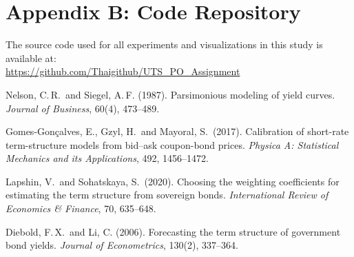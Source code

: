 \documentclass[12pt]{article}
\begin{document}
\section*{Appendix B: Code Repository}
The source code used for all experiments and visualizations in this study is available at:\\
\url{https://github.com/Thaigithub/UTS_PO_Assignment}



\begin{thebibliography}{}

Nelson, C.\,R.\ and Siegel, A.\,F. (1987).
Parsimonious modeling of yield curves.
\textit{Journal of Business}, 60(4), 473--489.

Gomes-Gon\c{c}alves, E., Gzyl, H.\ and Mayoral, S.\ (2017).
Calibration of short-rate term-structure models from bid–ask coupon-bond prices.
\textit{Physica A: Statistical Mechanics and its Applications}, 492, 1456--1472.

Lapshin, V.\ and Sohatskaya, S.\ (2020).
Choosing the weighting coefficients for estimating the term structure from sovereign bonds.
\textit{International Review of Economics \& Finance}, 70, 635--648.

Diebold, F.\,X.\ and Li, C. (2006).
Forecasting the term structure of government bond yields.
\textit{Journal of Econometrics}, 130(2), 337--364.

\end{thebibliography}
\end{document}
